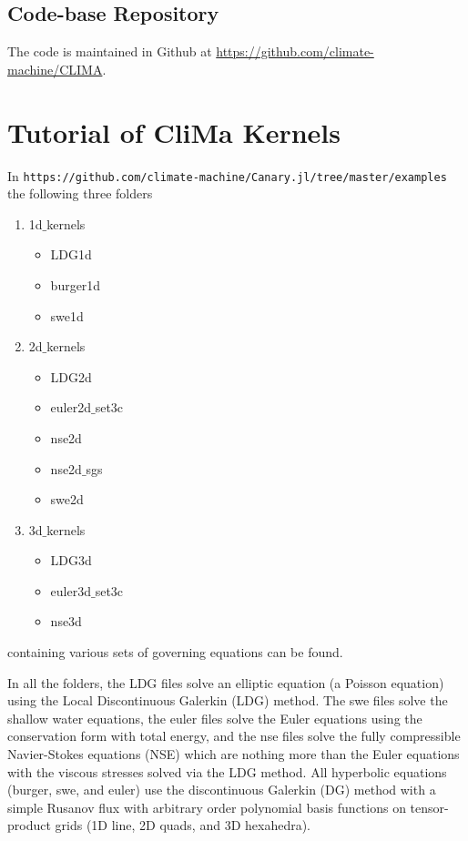 \documentclass{article}
\begin{document}
\subsection{Code-base Repository}
The code is maintained in Github at \url{https://github.com/climate-machine/CLIMA}.

\section{Tutorial of CliMa Kernels}
\label{sec:tutorial}

In \texttt{https://github.com/climate-machine/Canary.jl/tree/master/examples} the following three folders
\begin{enumerate}
    \item 1d$\_$kernels
    \begin{itemize}
        \item LDG1d
        \item burger1d
        \item swe1d
    \end{itemize}
    \item 2d$\_$kernels
    \begin{itemize}
        \item LDG2d
        \item euler2d$\_$set3c
        \item nse2d
        \item nse2d$\_$sgs
        \item swe2d
    \end{itemize}
    \item 3d$\_$kernels
    \begin{itemize}
        \item LDG3d
        \item euler3d$\_$set3c
        \item nse3d
    \end{itemize}
\end{enumerate}
containing various sets of governing equations can be found. 

In all the folders, the LDG files solve an elliptic equation (a Poisson equation) using the Local Discontinuous Galerkin (LDG) method.  The swe files solve the shallow water equations, the euler files solve the Euler equations using the conservation form with total energy, and the nse files solve the fully compressible Navier-Stokes equations (NSE) which are nothing more than the Euler equations with the viscous stresses solved via the LDG method.  All hyperbolic equations (burger, swe, and euler) use the discontinuous Galerkin (DG) method with a simple Rusanov flux with arbitrary order polynomial basis functions on tensor-product grids (1D line, 2D quads, and 3D hexahedra).
\end{document}
